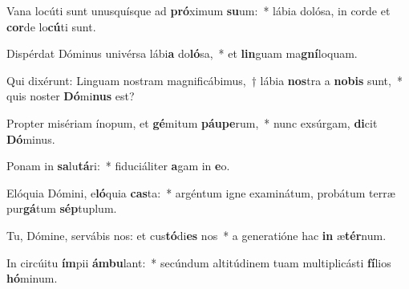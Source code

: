 \item Vana locúti sunt unusquísque ad \textbf{pró}ximum \textbf{su}um:~* lábia dolósa, in corde et \textbf{cor}de lo\textbf{cú}ti sunt.
\item Dispérdat Dóminus univérsa lábi\textbf{a} do\textbf{ló}sa,~* et \textbf{lin}guam ma\textbf{gní}loquam.
\item Qui dixérunt: Linguam nostram magnificábimus,~† lábia \textbf{nos}tra a \textbf{no}\textbf{bis} sunt,~* quis noster \textbf{Dó}mi\textbf{nus} est?
\item Propter misériam ínopum, et \textbf{gé}mitum \textbf{páu}\textbf{pe}rum,~* nunc exsúrgam, \textbf{di}cit \textbf{Dó}minus.
\item Ponam in \textbf{sa}lu\textbf{tá}ri:~* fiduciáliter \textbf{a}gam in \textbf{e}o.
\item Elóquia Dómini, e\textbf{ló}quia \textbf{cas}ta:~* argéntum igne examinátum, probátum terræ pur\textbf{gá}tum \textbf{sép}tuplum.
\item Tu, Dómine, servábis nos: et cus\textbf{tó}di\textbf{es} nos~* a generatióne hac \textbf{in} æ\textbf{tér}num.
\item In circúitu \textbf{ím}pii \textbf{ám}\textbf{bu}lant:~* secúndum altitúdinem tuam multiplicásti \textbf{fí}lios \textbf{hó}minum.
